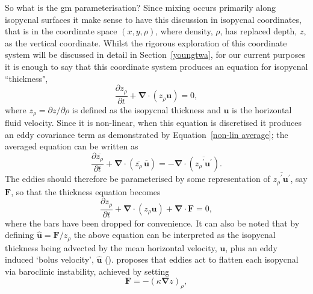 \documentclass[12pt,a4paper]{report}
\newcommand*\mean[1]{\overline{#1}}
\newcommand*\res[1]{{#1}^{\prime}}
\newcommand*\equref[1]{Equation~\eqref{#1}}
\newcommand*\secref[1]{Section~\ref{#1}}
\begin{document}
 So what is the \gls{gm} parameterisation? Since mixing occurs primarily
 along isopycnal surfaces it make sense to have this discussion in
 isopycnal coordinates, that is in the coordinate space $(x,y,\rho)$,
  where density, $\rho$, has replaced depth, $z$, as the vertical
  coordinate. Whilst the rigorous exploration of this coordinate system
  will be discussed in detail in \secref{youngtwa}, for our current purposes 
  it is enough to say that this coordinate system produces an equation
  for isopycnal ``thickness",
  \begin{equation}
  \label{cont}
  \frac{\partial z_{\rho}}{\partial t} + \boldsymbol{\nabla}\cdot\left(z_{\rho}\boldsymbol{u}\right) = 0,
  \end{equation}
  where $z_{\rho} = {\partial z}/{\partial \rho}$ is defined as the
   isopycnal thickness and $\boldsymbol{u}$ is the horizontal fluid
   velocity. Since it is non-linear, when this equation is discretised
   it produces an eddy covariance term as demonstrated by 
   \equref{non-lin average}; the averaged equation can be written as
     \begin{equation}
     \frac{\partial \mean{z_{\rho}}}{\partial t} + \boldsymbol{\nabla}\cdot\left(\mean{z_{\rho}} \, \mean{\boldsymbol{u}}\right) = - \boldsymbol{\nabla}\cdot\left(\mean{\res{z_{\rho}} \res{\boldsymbol{u}}}\right).
     \label{meancont}
     \end{equation}
   The eddies should therefore be parameterised by some representation
   of $\mean{\res{z_{\rho}} \res{\boldsymbol{u}}}$, say $\boldsymbol{F}$,
   so that the thickness equation becomes
     \begin{equation}
     \frac{\partial z_{\rho}}{\partial t} + \boldsymbol{\nabla}\cdot\left(z_{\rho}\boldsymbol{u}\right) + \boldsymbol{\nabla}\cdot\boldsymbol{F} = 0,
     \label{thicknessgeneralparam}
     \end{equation}
    where the bars have been dropped for convenience. It can also 
    be noted that by defining $\hat{\boldsymbol{u}} = \boldsymbol{F}/z_{\rho}$ the above equation can be interpreted as
    the isopycnal thickness
    being advected by the mean horizontal velocity, $\boldsymbol{u}$, 
    plus an eddy induced
    `bolus velocity', $\hat{\boldsymbol{u}}$ (\cite{gent1995parameterizing}). \cite{gent1990} proposes that eddies act to flatten each
    isopycnal via baroclinic instability, achieved by
    setting 
    \begin{equation}
    \boldsymbol{F} = - \left(\kappa
        \boldsymbol{\nabla} z \right)_{\rho},
    \end{equation}
\end{document}
